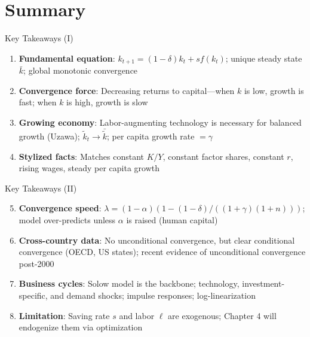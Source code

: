 \documentclass[blue]{beamer}
\begin{document}
\section{Summary}

\begin{frame}{Key Takeaways (I)}
	\begin{enumerate}
		\item \textbf{Fundamental equation}: $k_{t+1} = (1-\delta)k_t + sf(k_t)$; unique steady state $\bar{k}$; global monotonic convergence
		
		\item \textbf{Convergence force}: Decreasing returns to capital---when $k$ is low, growth is fast; when $k$ is high, growth is slow
		
		\item \textbf{Growing economy}: Labor-augmenting technology is necessary for balanced growth (Uzawa); $\tilde{k}_t \to \bar{\tilde{k}}$; per capita growth rate $= \gamma$
		
		\item \textbf{Stylized facts}: Matches constant $K/Y$, constant factor shares, constant $r$, rising wages, steady per capita growth
	\end{enumerate}
\end{frame}

\begin{frame}{Key Takeaways (II)}
	\begin{enumerate}
		\setcounter{enumi}{4}
		\item \textbf{Convergence speed}: $\lambda = (1-\alpha)(1 - (1-\delta)/((1+\gamma)(1+n)))$; model over-predicts unless $\alpha$ is raised (human capital)
		
		\item \textbf{Cross-country data}: No unconditional convergence, but clear conditional convergence (OECD, US states); recent evidence of unconditional convergence post-2000
		
		\item \textbf{Business cycles}: Solow model is the backbone; technology, investment-specific, and demand shocks; impulse responses; log-linearization
		
		\item \textbf{Limitation}: Saving rate $s$ and labor $\ell$ are exogenous; Chapter 4 will endogenize them via optimization
	\end{enumerate}
\end{frame}
\end{document}
